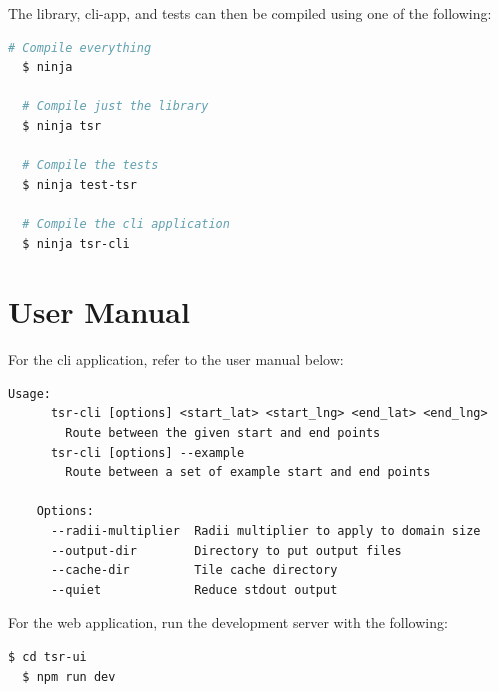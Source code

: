 \documentclass[12pt]{article}
\begin{document}
\begin{appendices}
  \noindent The library, cli-app, and tests can then be compiled using one of the following:

  \begin{lstlisting}[language=bash]
  # Compile everything
  $ ninja

  # Compile just the library
  $ ninja tsr

  # Compile the tests
  $ ninja test-tsr

  # Compile the cli application
  $ ninja tsr-cli
\end{lstlisting}

  \pagebreak
  \section{User Manual}

  For the cli application, refer to the user manual below:

  \begin{lstlisting}[]
  Usage: 
      tsr-cli [options] <start_lat> <start_lng> <end_lat> <end_lng>
        Route between the given start and end points
      tsr-cli [options] --example  
        Route between a set of example start and end points

    Options:
      --radii-multiplier  Radii multiplier to apply to domain size
      --output-dir        Directory to put output files
      --cache-dir         Tile cache directory
      --quiet             Reduce stdout output
\end{lstlisting}

  For the web application, run the development server with the following:

  \begin{lstlisting}[language=bash]
  $ cd tsr-ui
  $ npm run dev
\end{lstlisting}

  \pagebreak
  
  

\end{appendices}
\end{document}
